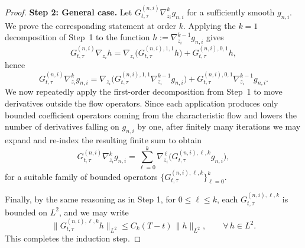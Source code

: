 \documentclass[pdflatex,sn-mathphys-num]{sn-jnl}
\theoremstyle{thmstyleone}%
\theoremstyle{thmstyletwo}%
\theoremstyle{thmstylethree}%
\begin{document}
\begin{proof}
\medskip
\noindent\textbf{Step 2: General case.}
Let $G^{(n,i)}_{t,\tau}\nabla_{z_i}^{k} g_{n,i}$ for a sufficiently smooth $g_{n,i}$. We prove the corresponding statement at order $k$.
Applying the $k=1$ decomposition of Step~1 to the function
$h:=\nabla_{z_i}^{k-1}g_{n,i}$ gives
\begin{equation}\label{eq:step1_applied_to_h}
G^{(n,i)}_{t,\tau}\nabla_{z_i}h
=
\nabla_{z_i}\big(G^{(n,i),1,1}_{t,\tau}h\big)
+
G^{(n,i),0,1}_{t,\tau}h,
\end{equation}
hence
\[
G^{(n,i)}_{t,\tau}\nabla_{z_i}^{k} g_{n,i}
=
\nabla_{z_i}\Big(G^{(n,i),1,1}_{t,\tau}\nabla_{z_i}^{k-1}g_{n,i}\Big)
+
G^{(n,i),0,1}_{t,\tau}\nabla_{z_i}^{k-1}g_{n,i}.
\]
We now repeatedly apply the first-order decomposition from Step~1 to move
derivatives outside the flow operators. Since each application produces only
bounded coefficient operators coming from the characteristic flow and lowers the
number of derivatives falling on $g_{n,i}$ by one, after finitely many iterations
we may expand and re-index the resulting finite sum to obtain
\[
G^{(n,i)}_{t,\tau}\nabla_{z_i}^{k} g_{n,i}
=
\sum_{\ell=0}^{k}
\nabla_{z_i}^{\,\ell}\big( G^{(n,i),\ell,k}_{t,\tau} g_{n,i}\big),
\]
for a suitable family of bounded operators
$\{G^{(n,i),\ell,k}_{t,\tau}\}_{\ell=0}^k$.

\noindent
Finally, by the same reasoning as in Step 1, for $0 \leq \ell \leq k$, each $G^{(n,i),\ell,k}_{t,\tau}$ is bounded
on $L^2$, and we may write
\[
\|G^{(n,i),\ell,k}_{t,\tau} h\|_{L^2}
\le C_k(T-t)\,\|h\|_{L^2},
\qquad \forall\, h\in L^2.
\]
This completes the induction step.
\end{proof}
\end{document}

